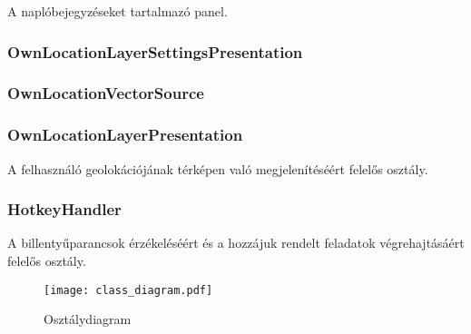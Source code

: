 A naplóbejegyzéseket tartalmazó panel.

\subsubsection{OwnLocationLayerSettingsPresentation}
\subsubsection{OwnLocationVectorSource}
\subsubsection{OwnLocationLayerPresentation}

A felhasználó geolokációjának térképen való megjelenítéséért felelős osztály.

\subsubsection{HotkeyHandler}

A billentyűparancsok érzékeléséért és a hozzájuk rendelt feladatok végrehajtásáért felelős osztály.

\begin{figure}[H]
  \centering
    \texttt{[image: class\_diagram.pdf]}
  \caption{Osztálydiagram}
\end{figure}
